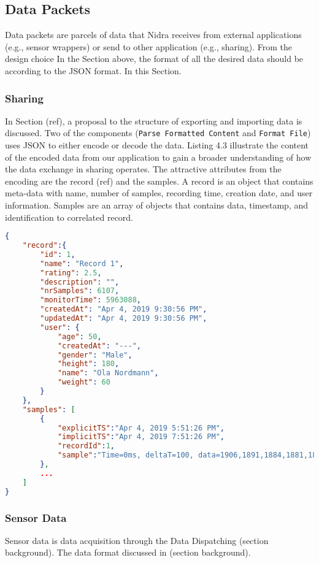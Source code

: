 \subsection{Data Packets}
Data packets are parcels of data that Nidra receives from external applications (e.g., sensor wrappers) or send to other application (e.g., sharing). From the design choice In the Section above, the format of all the desired data should be according to the JSON format.  In this Section.

\subsubsection{Sharing}

In Section (ref), a proposal to the structure of exporting and importing data is discussed. Two of the components (\verb|Parse Formatted Content| and \verb|Format File|) uses JSON to either encode or decode the data. Listing 4.3 illustrate the content of the encoded data from our application to gain a broader understanding of how the data exchange in sharing operates. The attractive attributes from the encoding are the record (ref) and the samples.  A record is an object that contains meta-data with name, number of samples, recording time, creation date, and user information. Samples are an array of objects that contains data, timestamp, and identification to correlated record. 

    
\begin{lstlisting}[language=json, caption={My Caption}, captionpos=b]
{
    "record":{  
        "id": 1,
        "name": "Record 1",
        "rating": 2.5,
        "description": "",
        "nrSamples": 6107,
        "monitorTime": 5963088,
        "createdAt": "Apr 4, 2019 9:30:56 PM",
        "updatedAt": "Apr 4, 2019 9:30:56 PM",
        "user": {  
            "age": 50,
            "createdAt": "---",
            "gender": "Male",
            "height": 180,
            "name": "Ola Nordmann",
            "weight": 60
        }
    },
    "samples": [  
        {  
            "explicitTS":"Apr 4, 2019 5:51:26 PM",
            "implicitTS":"Apr 4, 2019 7:51:26 PM",
            "recordId":1,
            "sample":"Time=0ms, deltaT=100, data=1906,1891,1884,1881,1876,1718,1690"
        },
        ...
    ]
}
\end{lstlisting}

\subsubsection{Sensor Data}
Sensor data is data acquisition through the Data Dispatching (section background). The data format discussed in (section background). 
